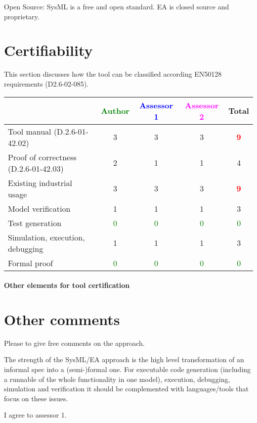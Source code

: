 \begin{assessor2}
Open Source: SysML is a free and open standard. EA is closed source and proprietary.

\end{assessor2}


\section{Certifiability}

This section discusses how the tool can be classified according EN50128 requirements (D2.6-02-085).


\begin{tabular}{|l | c | c | c | c|}
\hline
& \textcolor{green}{Author} & \textcolor{blue}{Assessor 1} & \textcolor{magenta}{Assessor 2} & Total \\
\hline 
Tool manual (D.2.6-01-42.02) &3 & 3    &3 & \textcolor{red}{\textbf{9}} \\
\hline
Proof of correctness (D.2.6-01-42.03)   &2 & 1    & 1    & 4     \\
\hline
Existing industrial  usage  &3 & 3    &3 & \textcolor{red}{\textbf{9}} \\
\hline
Model verification &1 & 1    & 1    & 3      \\
\hline
Test generation & \textcolor{green}{0}   & \textcolor{green}{0} & \textcolor{green}{0} & \textcolor{green}{0} \\
\hline
Simulation, execution, debugging &1 & 1    &1 & 3     \\
\hline
Formal proof & \textcolor{green}{0}   & \textcolor{green}{0} & \textcolor{green}{0} & \textcolor{green}{0} \\
\hline
\end{tabular}

\paragraph{Other elements for tool certification}

\section{Other comments}
Please to  give free comments on the approach.

\begin{assessor1}
The strength of the SysML/EA approach is the high level transformation of an informal spec into a (semi-)formal one. 
For executable code generation (including a runnable of the whole functionality in one model), execution, debugging, simulation and verification it should be complemented with languages/tools that focus on these issues.
\end{assessor1}

\begin{assessor2}
I agree to assessor 1.
\end{assessor2}


